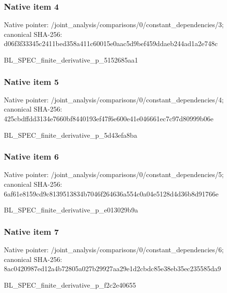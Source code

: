 \documentclass[10pt,a4paper]{article}
\begin{document}
\subsubsection{Native item 4}
Native pointer: /joint\_\allowbreak{}analysis/comparisons/0/constant\_\allowbreak{}dependencies/3; canonical SHA-256: d06f3f33345c2411bed358a411c60015e0aac5d9bef459ddaeb244ad1a2e748c

\begingroup\raggedright\sloppy BL\_\allowbreak{}SPEC\_\allowbreak{}finite\_\allowbreak{}derivative\_\allowbreak{}p\_\allowbreak{}5152685aa1\par\endgroup

\subsubsection{Native item 5}
Native pointer: /joint\_\allowbreak{}analysis/comparisons/0/constant\_\allowbreak{}dependencies/4; canonical SHA-256: 425cbdffdd3134e7660bf8440193ef47f6e600e41e046661ec7c97d80999b06e

\begingroup\raggedright\sloppy BL\_\allowbreak{}SPEC\_\allowbreak{}finite\_\allowbreak{}derivative\_\allowbreak{}p\_\allowbreak{}5d43efa8ba\par\endgroup

\subsubsection{Native item 6}
Native pointer: /joint\_\allowbreak{}analysis/comparisons/0/constant\_\allowbreak{}dependencies/5; canonical SHA-256: 6af61e8159cd9c8139513834b7046f264636a554c0a04e5128d4d36b8d91766e

\begingroup\raggedright\sloppy BL\_\allowbreak{}SPEC\_\allowbreak{}finite\_\allowbreak{}derivative\_\allowbreak{}p\_\allowbreak{}e013029b9a\par\endgroup

\subsubsection{Native item 7}
Native pointer: /joint\_\allowbreak{}analysis/comparisons/0/constant\_\allowbreak{}dependencies/6; canonical SHA-256: 8ac0420987ed12a4b72805a027b29927aa29e1d2cbdc85e38eb35ec235585da9

\begingroup\raggedright\sloppy BL\_\allowbreak{}SPEC\_\allowbreak{}finite\_\allowbreak{}derivative\_\allowbreak{}p\_\allowbreak{}f2c2e40655\par\endgroup
\end{document}
